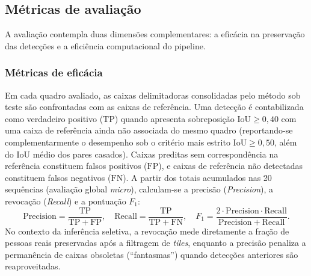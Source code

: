 \documentclass{ieeeaccess}
\begin{document}
\subsection{Métricas de avaliação}
\label{subsec:metricas}

A avaliação contempla duas dimensões complementares: a eficácia na preservação das detecções e a eficiência computacional do pipeline.

\subsubsection{Métricas de eficácia}
Em cada quadro avaliado, as caixas delimitadoras consolidadas pelo método sob teste são confrontadas com as caixas de referência. Uma detecção é contabilizada como verdadeiro positivo ($\mathrm{TP}$) quando apresenta sobreposição $\mathrm{IoU} \ge 0{,}40$ com uma caixa de referência ainda não associada do mesmo quadro (reportando-se complementarmente o desempenho sob o critério mais estrito $\mathrm{IoU} \ge 0{,}50$, além do $\mathrm{IoU}$ médio dos pares casados). Caixas preditas sem correspondência na referência constituem falsos positivos ($\mathrm{FP}$), e caixas de referência não detectadas constituem falsos negativos ($\mathrm{FN}$). A partir dos totais acumulados nas 20 sequências (avaliação global \textit{micro}), calculam-se a precisão (\textit{Precision}), a revocação (\textit{Recall}) e a pontuação $F_1$:
\begin{equation}
\mathrm{Precision} = \frac{\mathrm{TP}}{\mathrm{TP} + \mathrm{FP}}, \quad
\mathrm{Recall} = \frac{\mathrm{TP}}{\mathrm{TP} + \mathrm{FN}}, \quad
F_1 = \frac{2 \cdot \mathrm{Precision} \cdot \mathrm{Recall}}{\mathrm{Precision} + \mathrm{Recall}}.
\label{eq:metricas_eficacia}
\end{equation}
No contexto da inferência seletiva, a revocação mede diretamente a fração de pessoas reais preservadas após a filtragem de \textit{tiles}, enquanto a precisão penaliza a permanência de caixas obsoletas (``fantasmas'') quando detecções anteriores são reaproveitadas.
\end{document}
